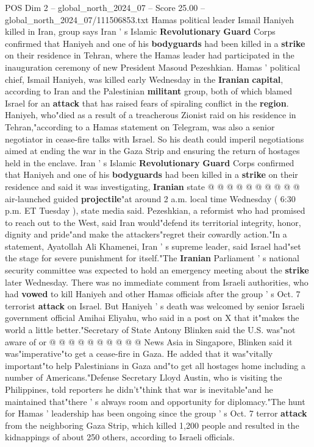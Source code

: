 \begin{textsample}{POS Dim 2 – global\_north\_2024\_07 – Score 25.00 – global\_north\_2024\_07/111506853.txt}  \label{ex:f2_pos_184}
Hamas political leader Ismail Haniyeh killed in Iran, group says Iran ' s Islamic \textbf{Revolutionary} \textbf{Guard} Corps confirmed that Haniyeh and one of his \textbf{bodyguards} had been killed in a \textbf{strike} on their residence in Tehran, where the Hamas leader had participated in the inauguration ceremony of new President Masoud Pezeshkian.
Hamas ' political chief, Ismail Haniyeh, was killed early Wednesday in the \textbf{Iranian} \textbf{capital}, according to Iran and the Palestinian \textbf{militant} group, both of which blamed Israel for an \textbf{attack} that has raised fears of spiraling conflict in the \textbf{region}.
Haniyeh, who"died as a result of a treacherous Zionist raid on his residence in Tehran,"according to a Hamas statement on Telegram, was also a senior negotiator in cease-fire talks with Israel.
So his death could imperil negotiations aimed at ending the war in the Gaza Strip and ensuring the return of hostages held in the enclave.
Iran ' s Islamic \textbf{Revolutionary} \textbf{Guard} Corps confirmed that Haniyeh and one of his \textbf{bodyguards} had been killed in a \textbf{strike} on their residence and said it was investigating, \textbf{Iranian} state @ @ @ @ @ @ @ @ @ @ air-launched guided \textbf{projectile}"at around 2 a.m. local time Wednesday ( 6:30 p.m.
ET Tuesday ), state media said.
Pezeshkian, a reformist who had promised to reach out to the West, said Iran would"defend its territorial integrity, honor, dignity and pride"and make the attackers"regret their cowardly action."In a statement, Ayatollah Ali Khamenei, Iran ' s supreme leader, said Israel had"set the stage for severe punishment for itself."The \textbf{Iranian} Parliament ' s national security committee was expected to hold an emergency meeting about the \textbf{strike} later Wednesday.
There was no immediate comment from Israeli authorities, who had \textbf{vowed} to kill Haniyeh and other Hamas officials after the group ' s Oct. 7 terrorist \textbf{attack} on Israel.
But Haniyeh ' s death was welcomed by senior Israeli government official Amihai Eliyahu, who said in a post on X that it"makes the world a little better."Secretary of State Antony Blinken said the U.S. was"not aware of or @ @ @ @ @ @ @ @ @ @ News Asia in Singapore, Blinken said it was"imperative"to get a cease-fire in Gaza.
He added that it was"vitally important"to help Palestinians in Gaza and"to get all hostages home including a number of Americans."Defense Secretary Lloyd Austin, who is visiting the Philippines, told reporters he didn't"think that war is inevitable"and he maintained that"there ' s always room and opportunity for diplomacy."The hunt for Hamas ' leadership has been ongoing since the group ' s Oct. 7 terror \textbf{attack} from the neighboring Gaza Strip, which killed 1,200 people and resulted in the kidnappings of about 250 others, according to Israeli officials.

\end{textsample}
